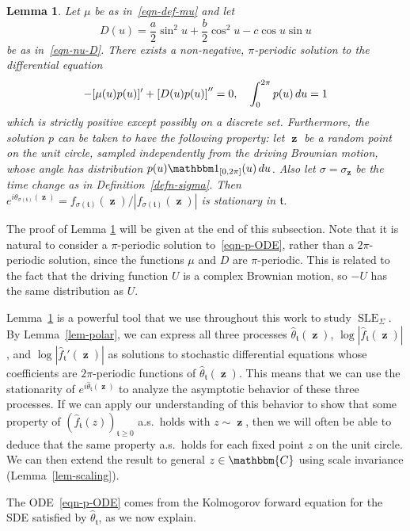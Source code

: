 \documentclass[11pt]{article}
\theoremstyle{plain}
\newtheorem{lem}[thm]{Lemma}
\theoremstyle{definition}
\numberwithin{equation}{section}
\newcommand{\eqb}{\begin{equation}}
\newcommand{\eqe}{\end{equation}}
\newcommand{\BB}{\mathbbm}
\newcommand{\op}{\operatorname}
\newcommand{\wh}{\widehat}
\newcommand{\SLEG}{{\operatorname{SLE}}_\Sigma}
\newcommand{\zz}{{\op{\mathbf{z}}}}
\newcommand{\tz}{{\mathfrak t}}
\let\originalleft\left
\let\originalright\right
\renewcommand{\left}{\mathopen{}\mathclose\bgroup\originalleft}
\renewcommand{\right}{\aftergroup\egroup\originalright}
\begin{document}
\begin{lem}
\label{lem-p}
Let $\mu$ be as in~\eqref{eqn-def-mu} and let
\eqb
\label{eqn-def-D}
D(u) =  \frac{a}{2} \sin^2{u} + \frac{b}{2} \cos^2{u} - c \cos{u} \sin{u} 
\eqe
be as in~\eqref{eqn-nu-D}. There exists a non-negative, $\pi$-periodic solution to the differential equation
\eqb
-[\mu(u) p(u)]' +  \left[ D(u) p(u) \right]'' = 0, \quad \int_0^{2\pi} p(u) \,du = 1  
\label{eqn-p-ODE}
\eqe
which is strictly positive except possibly on a discrete set. 
Furthermore, the solution $p$ can be taken to have the following property: let $\zz$ be a random point on the unit circle, sampled independently from the driving Brownian motion, whose angle has distribution $p(u) \BB 1_{[0,2\pi]}(u) \,du$. Also let $\sigma = \sigma_\zz$ be the time change as in Definition~\ref{defn-sigma}. Then $e^{i \theta_{\sigma(\tz)}(\zz)} = f_{\sigma(\tz)}(\zz) / |f_{\sigma(\tz)}(\zz)|$  is stationary in $\tz$.
\end{lem}

The proof of Lemma \ref{lem-p} will be given at the end of this subsection. Note that it is natural to consider a $\pi$-periodic solution to~\eqref{eqn-p-ODE}, rather than a $2\pi$-periodic solution, since the functions $\mu$ and $D$ are $\pi$-periodic. This is related to the fact that the driving function $U$ is a complex Brownian motion, so $-U$ has the same distribution as $U$.

Lemma~\ref{lem-p} is a powerful tool that we use throughout this work to study $\SLEG$. By Lemma~\ref{lem-polar}, we can express all three processes $\wh \theta_\tz(\zz)$, $\log|\wh f_{\tz}(\zz)|$, and $\log|\wh f_{\tz}'(\zz)|$ as solutions to stochastic differential equations whose coefficients are $2\pi$-periodic functions of $\wh \theta_\tz(\zz)$. This means that we can use the stationarity of $e^{i \wh\theta_\tz(\zz)}$ to analyze the asymptotic behavior of these three processes.  If we can apply our understanding of this behavior to show that some property of $(\wh f_\tz(z))_{\tz \geq 0}$ a.s.\ holds with $z \sim \zz$, then we will often be able to deduce that the same property a.s.\ holds for each fixed point $z$ on the unit circle.  We can then extend the result to general $z \in \BB{C}$ using scale invariance (Lemma~\ref{lem-scaling}).  

The ODE~\eqref{eqn-p-ODE} comes from the Kolmogorov forward equation for the SDE satisfied by $\wh\theta_\tz$, as we now explain. 
\end{document}
